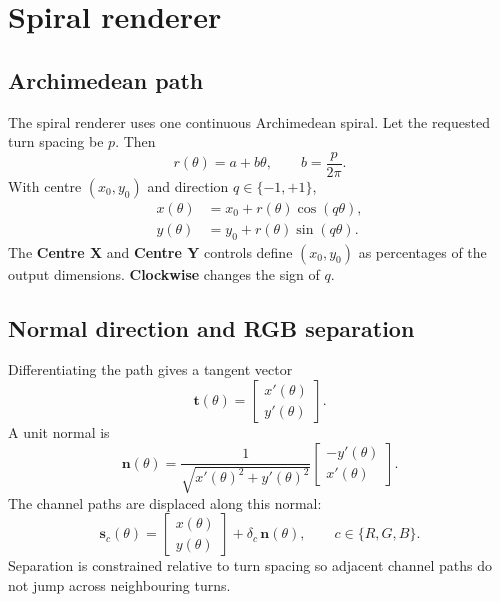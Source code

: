 \documentclass[10.5pt,a4paper]{article}
\begin{document}
\clearpage
\section{Spiral renderer}
\subsection{Archimedean path}
The spiral renderer uses one continuous Archimedean spiral. Let the requested turn spacing be $p$. Then
\begin{equation}
r(\theta)=a+b\theta,
\qquad
b=\frac{p}{2\pi}.
\end{equation}
With centre $(x_0,y_0)$ and direction $q\in\{-1,+1\}$,
\begin{equation}
\begin{aligned}
x(\theta)&=x_0+r(\theta)\cos(q\theta),\\
y(\theta)&=y_0+r(\theta)\sin(q\theta).
\end{aligned}
\end{equation}
The \textbf{Centre X} and \textbf{Centre Y} controls define $(x_0,y_0)$ as percentages of the output dimensions. \textbf{Clockwise} changes the sign of $q$.

\subsection{Normal direction and RGB separation}
Differentiating the path gives a tangent vector
\begin{equation}
\mathbf{t}(\theta)=
\begin{bmatrix}
x'(\theta)\\y'(\theta)
\end{bmatrix}.
\end{equation}
A unit normal is
\begin{equation}
\mathbf{n}(\theta)=
\frac{1}{\sqrt{x'(\theta)^2+y'(\theta)^2}}
\begin{bmatrix}
-y'(\theta)\\x'(\theta)
\end{bmatrix}.
\end{equation}
The channel paths are displaced along this normal:
\begin{equation}
\mathbf{s}_c(\theta)=
\begin{bmatrix}x(\theta)\\y(\theta)\end{bmatrix}
+\delta_c\,\mathbf{n}(\theta),
\qquad c\in\{R,G,B\}.
\end{equation}
Separation is constrained relative to turn spacing so adjacent channel paths do not jump across neighbouring turns.
\end{document}
